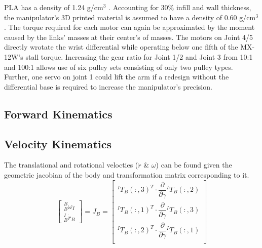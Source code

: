 PLA has a density of 1.24 g/cm$^3$ \cite{tt}. Accounting for 30\% infill and wall thickness, the manipulator’s 3D printed material is assumed to have a density of 0.60 g/cm$^3$. The torque required for each motor can again be approximated by the moment caused by the links’ masses at their center’s of masses. The motors on Joint 4/5 directly wrotate the wrist differential while operating below one fifth of the MX-12W’s stall torque. Increasing the gear ratio for Joint 1/2 and Joint 3 from 10:1 and 100:1 allows use of six pulley sets consisting of only two pulley types. Further, one servo on joint 1 could lift the arm if a redesign without the differential base is required to increase the manipulator's precision.

\subsection{Forward Kinematics}

\subsection{Velocity Kinematics}
The translational and rotational velocties ($\dot{r}$ \& $\omega$) can be found given the geometric jacobian of the body and transformation matrix corresponding to it.
\[
\begin{bmatrix}
  ^B_B\omega_I\\
  ^I_B\dot{r}_B
\end{bmatrix}
= J_B =
\begin{bmatrix}
  ^IT_B(:,3)^T \cdot \dfrac{\partial}{\partial\gamma}{}^IT_B(:,2) \\
  ^IT_B(:,1)^T \cdot \dfrac{\partial}{\partial\gamma}{}^IT_B(:,3) \\
  ^IT_B(:,2)^T \cdot \dfrac{\partial}{\partial\gamma}{}^IT_B(:,1) \\
\end{bmatrix}
\]


